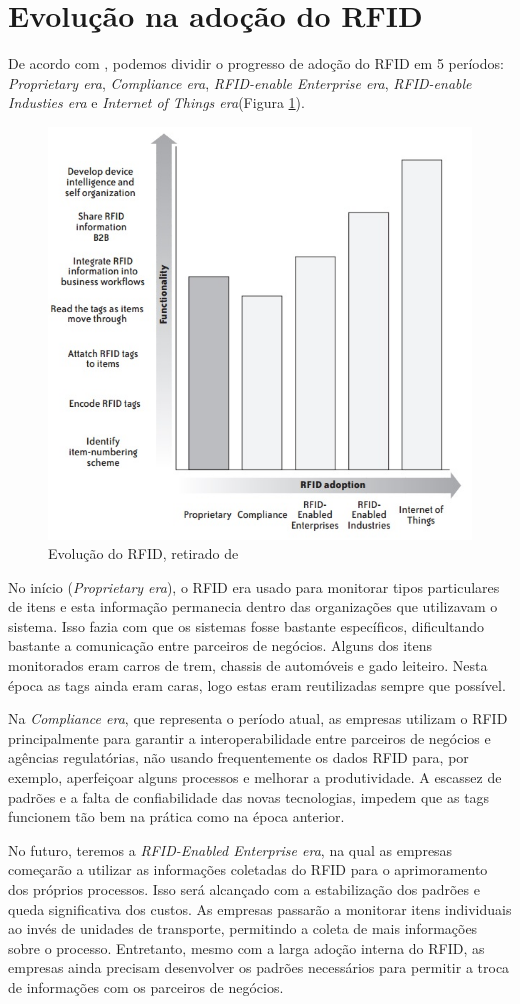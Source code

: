 \documentclass[a4paper,12pt,titlepage]{article}
\begin{document}
	\section{Evolução na adoção do RFID}
	De acordo com \cite{rfidbook}, podemos dividir o progresso de adoção do RFID em 5 períodos: \textit{Proprietary era}, \textit{Compliance era}, \textit{RFID-enable Enterprise era}, \textit{RFID-enable Industies era} e \textit{Internet of Things era}(Figura \ref{fig:rfideras}).
	
	\begin{figure}[h!]
		\centering
		\includegraphics[width=0.6\linewidth]{rfideras}
		\caption{Evolução do RFID, retirado de \cite{rfidbook}}
		\label{fig:rfideras}
	\end{figure}
	
	No início (\textit{Proprietary era}), o RFID era usado para monitorar tipos particulares de itens e esta informação permanecia dentro das organizações que utilizavam o sistema. Isso fazia com que os sistemas fosse bastante específicos, dificultando bastante a comunicação entre parceiros de negócios. Alguns dos itens monitorados eram carros de trem, chassis de automóveis e gado leiteiro. Nesta época as tags ainda eram caras, logo estas eram reutilizadas sempre que possível. 
	
	Na \textit{Compliance era}, que representa o período atual, as empresas utilizam o RFID principalmente para garantir a interoperabilidade entre parceiros de negócios e agências regulatórias, não usando frequentemente os dados RFID para, por exemplo, aperfeiçoar alguns processos e melhorar a produtividade. A escassez de padrões e a falta de confiabilidade das novas tecnologias, impedem que as tags funcionem tão bem na prática como na época anterior.
	
	No futuro, teremos a \textit{RFID-Enabled Enterprise era}, na qual as empresas começarão a utilizar as informações coletadas do RFID para o aprimoramento dos próprios processos. Isso será alcançado com a estabilização dos padrões e queda significativa dos custos. As empresas passarão a monitorar itens individuais ao invés de unidades de transporte, permitindo a coleta de mais informações sobre o processo. Entretanto, mesmo com a larga adoção interna do RFID, as empresas ainda precisam desenvolver os padrões necessários para permitir a troca de informações com os parceiros de negócios. 
	
\end{document}
